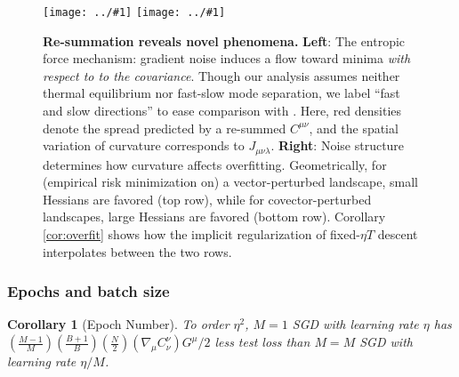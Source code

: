 \documentclass{article}
\theoremstyle{plain}
\newtheorem{cor}{Corollary}
\theoremstyle{definition}
\newcommand{\wrap}[1]{\left(#1\right)}
\newcommand{\plotmooh}[3]{\texttt{[image: ../\#1]}}
\begin{document}
            \begin{figure}[h!]
                \centering
                \plotmooh{diagrams/entropic-force-diagram}{}{0.32\columnwidth} 
                \plotmooh{diagrams/sharp}{}{0.31\columnwidth}
                \caption{
                    {\bf Re-summation reveals novel phenomena.}
                    {\bf Left}:
                        The entropic force mechanism: gradient noise induces a flow
                        toward minima  \emph{with respect to to the
                        covariance}.  Though our analysis assumes neither thermal
                        equilibrium nor fast-slow mode separation, we label ``fast
                        and slow directions'' to ease comparison
                        with \cite{we19b}.  Here, red densities denote
                        the spread predicted by a re-summed $C^{\mu\nu}$, and
                        the spatial variation of curvature corresponds to
                        $J_{\mu\nu\lambda}$. 
                    {\bf Right}:
                        Noise structure determines how curvature affects
                        overfitting.  Geometrically, for (empirical risk
                        minimization on) a vector-perturbed landscape, small
                        Hessians are favored (top row), while for
                        covector-perturbed landscapes, large Hessians are favored
                        (bottom row).  Corollary \ref{cor:overfit} shows how the
                        implicit regularization of fixed-$\eta T$ descent interpolates 
                        between the two rows.
                }
                \label{fig:cubicandspring}
            \end{figure}
    
        \subsubsection{Epochs and batch size} \label{subsect:epochs-batch}
    
            \begin{cor}[Epoch Number] \label{cor:epochs}
                To order $\eta^2$, $M=1$ SGD with learning rate $\eta$ has 
                $
                     \wrap{\frac{M-1}{M}}\wrap{\frac{B+1}{B}}\wrap{\frac{N}{2}}
                     \wrap{\nabla_\mu C^{\nu}_{\nu}} G^\mu / 2
                $
                less test loss than $M=M$ SGD with learning rate $\eta/M$.
            \end{cor}
        
\end{document}
